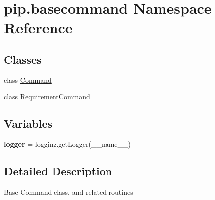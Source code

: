 \hypertarget{namespacepip_1_1basecommand}{}\section{pip.\+basecommand Namespace Reference}
\label{namespacepip_1_1basecommand}
\subsection*{Classes}
\begin{DoxyCompactItemize}
\item 
class \hyperlink{classpip_1_1basecommand_1_1_command}{Command}
\item 
class \hyperlink{classpip_1_1basecommand_1_1_requirement_command}{Requirement\+Command}
\end{DoxyCompactItemize}
\subsection*{Variables}
\begin{DoxyCompactItemize}
\item 
\mbox{\label{namespacepip_1_1basecommand_a397efb5089172e874d4f5035d4144267}} 
{\bfseries logger} = logging.\+get\+Logger(\+\_\+\+\_\+name\+\_\+\+\_\+)
\end{DoxyCompactItemize}


\subsection{Detailed Description}
\begin{DoxyVerb}Base Command class, and related routines\end{DoxyVerb}
 